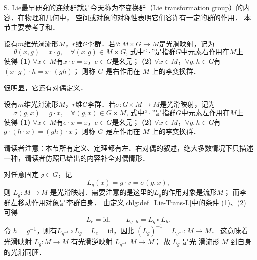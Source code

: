 S. Lie最早研究的连续群就是今天称为李变换群（Lie transformation group）的内容．在物理和几何中，
空间或对象的对称性表明它们容许有一定的群的作用．
本节主要参考了\parencite[\S 6.5]{chenwh2001}和\parencite[\S 9.3]{marsden-1999-IMS}．



\begin{definition}\label{chlg:def_Lie-Trans-R}
    设有$m$维光滑流形$M$，$r$维$G$李群．若$\theta:M\times G \to M$是光滑映射，记为
    \begin{equation*}
        \theta(x,g)=x\cdot g,\quad \forall(x,g)\in M\times G,
        \ \text{式中“} \cdot \text{”是指群}G\text{中元素右作用在}M \text{上}
    \end{equation*}
    使得
    {\bfseries (1)} $\forall x\in M$有$x\cdot e=x$，$e\in G$是幺元；
    {\bfseries (2)} $\forall x \in M$，$\forall g, h \in G$有$(x \cdot g) \cdot h=x \cdot(g h)$；
    则称 $G$ 是{\heiti 右作用在 $M$ 上的李变换群}．
\end{definition}

很明显，它还有对偶定义．
\begin{definition}\label{chlg:def_Lie-Trans-L}
    设有$m$维光滑流形$M$，$r$维$G$李群．若$\sigma:G\times M \to M$是光滑映射，记为
    \begin{equation*}
        \sigma(g,x)=g\cdot x,\quad \forall(g,x)\in G\times M,
        \ \text{式中“} \cdot \text{”是指群}G\text{中元素左作用在}M \text{上}
    \end{equation*}
    使得
    {\bfseries (1)} $\forall x \in M$有$e\cdot x=x$，$e\in G$是幺元；
    {\bfseries (2)} $\forall x \in M$，$\forall g, h \in G$有$g\cdot (h \cdot x) =(gh)\cdot x$；
    则称 $G$ 是{\heiti 左作用在 $M$ 上的李变换群}．
\end{definition}

请读者注意：本节所有定义、定理都有左、右对偶的叙述，绝大多数情况下只描述
一种，请读者仿照已给出的内容补全对偶情形．

对任意固定 $g \in G$，记
\begin{equation}
    L_g(x)=g \cdot x=\sigma( g,x),
\end{equation}
则 $L_g: M \rightarrow M$ 是光滑映射．需要注意的是这里的$L_g$的作用对象是流形$M$；
而李群左移动作用对象是李群自身．
由定义\ref{chlg:def_Lie-Trans-L}中的条件 (1)、(2) 可得
\begin{equation}\label{chlg:eqn_tmplrg}
    L_e  =\mathrm{id}, \qquad
    L_{g \cdot h}  =L_g \circ L_h .
\end{equation}
令 $h=g^{-1}$，则有$L_{g^{-1}} \circ L_{g}=L_{e}=\mathrm{id} $，因此
$(L_{g})^{-1}=L_{g^{-1}}: M \to M $．
这意味着光滑映射 $L_{g}: M \to M$ 有光滑逆映射 $L_{g^{-1}}: M \to M$； 
故 $L_{g}$ 是光 滑流形 $M$ 到自身的光滑{\heiti 同胚}．

